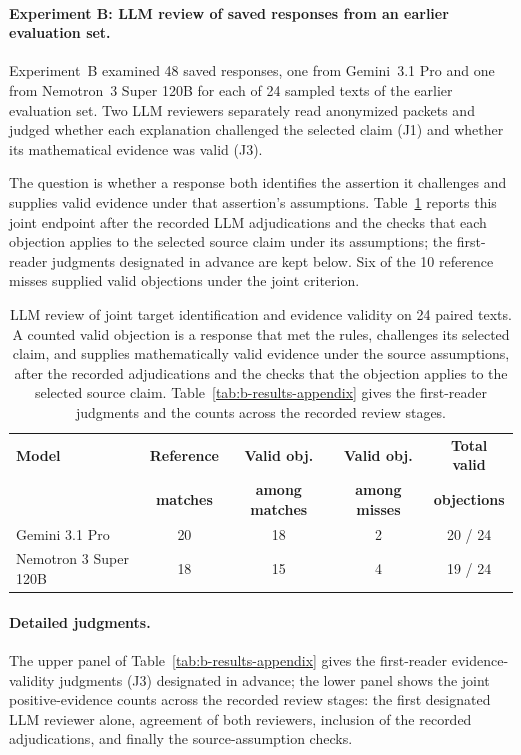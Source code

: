 \paragraph{Experiment B: LLM review of saved responses from an earlier evaluation set.} Experiment~B examined 48 saved responses, one from Gemini~3.1 Pro and one from Nemotron~3 Super 120B for each of 24 sampled texts of the earlier evaluation set. Two LLM reviewers separately read anonymized packets and judged whether each explanation challenged the selected claim (J1) and whether its mathematical evidence was valid (J3).

The question is whether a response both identifies the assertion it challenges and supplies valid evidence under that assertion's assumptions. Table~\ref{tab:b-results} reports this joint endpoint after the recorded LLM adjudications and the checks that each objection applies to the selected source claim under its assumptions; the first-reader judgments designated in advance are kept below. Six of the 10 reference misses supplied valid objections under the joint criterion.

\begin{table}[h]
\centering
\begin{tabular}{l c c c c}
\toprule
\textbf{Model} & \textbf{Reference} & \textbf{Valid obj.} & \textbf{Valid obj.} & \textbf{Total valid} \\
& \textbf{matches} & \textbf{among matches} & \textbf{among misses} & \textbf{objections} \\
\midrule
Gemini 3.1 Pro & 20 & 18 & 2 & 20 / 24 \\
Nemotron 3 Super 120B & 18 & 15 & 4 & 19 / 24 \\
\bottomrule
\end{tabular}
\caption{LLM review of joint target identification and evidence validity on 24 paired texts. A counted valid objection is a response that met the rules, challenges its selected claim, and supplies mathematically valid evidence under the source assumptions, after the recorded adjudications and the checks that the objection applies to the selected source claim. Table~\ref{tab:b-results-appendix} gives the first-reader judgments and the counts across the recorded review stages.}
\label{tab:b-results}
\end{table}

\paragraph{Detailed judgments.} The upper panel of Table~\ref{tab:b-results-appendix} gives the first-reader evidence-validity judgments (J3) designated in advance; the lower panel shows the joint positive-evidence counts across the recorded review stages: the first designated LLM reviewer alone, agreement of both reviewers, inclusion of the recorded adjudications, and finally the source-assumption checks.

